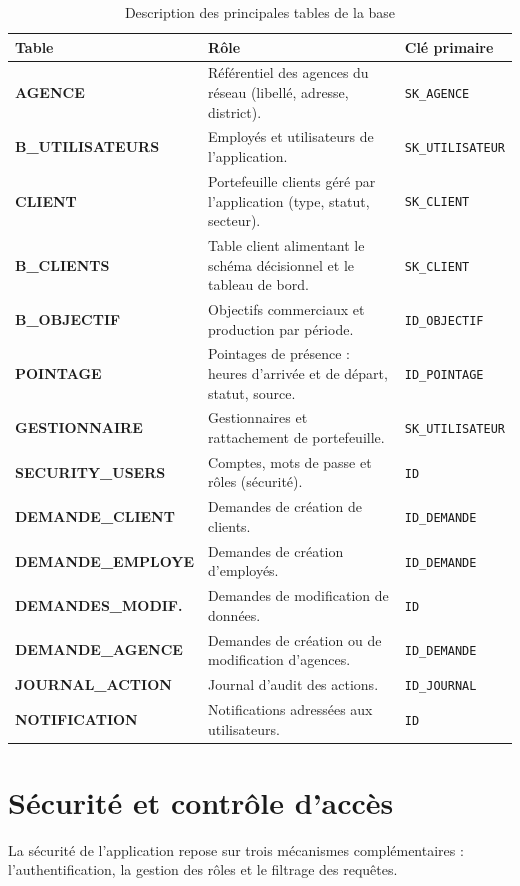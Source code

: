 \begin{table}[htbp]
\centering
\caption{Description des principales tables de la base}
\label{tab:tables}
\renewcommand{\arraystretch}{1.2}
\begin{tabularx}{\textwidth}{|>{\bfseries\ttfamily}p{3.6cm}|X|p{2.8cm}|}
\hline
\textmd{\textbf{Table}} & \textbf{Rôle} & \textbf{Clé primaire}\\
\hline
AGENCE & Référentiel des agences du réseau (libellé, adresse, district). & \texttt{SK\_AGENCE}\\
\hline
B\_UTILISATEURS & Employés et utilisateurs de l'application. & \texttt{SK\_UTILISATEUR}\\
\hline
CLIENT & Portefeuille clients géré par l'application (type, statut, secteur). & \texttt{SK\_CLIENT}\\
\hline
B\_CLIENTS & Table client alimentant le schéma décisionnel et le tableau de bord. & \texttt{SK\_CLIENT}\\
\hline
B\_OBJECTIF & Objectifs commerciaux et production par période. & \texttt{ID\_OBJECTIF}\\
\hline
POINTAGE & Pointages de présence : heures d'arrivée et de départ, statut, source. & \texttt{ID\_POINTAGE}\\
\hline
GESTIONNAIRE & Gestionnaires et rattachement de portefeuille. & \texttt{SK\_UTILISATEUR}\\
\hline
SECURITY\_USERS & Comptes, mots de passe et rôles (sécurité). & \texttt{ID}\\
\hline
DEMANDE\_CLIENT & Demandes de création de clients. & \texttt{ID\_DEMANDE}\\
\hline
DEMANDE\_EMPLOYE & Demandes de création d'employés. & \texttt{ID\_DEMANDE}\\
\hline
DEMANDES\_MODIF. & Demandes de modification de données. & \texttt{ID}\\
\hline
DEMANDE\_AGENCE & Demandes de création ou de modification d'agences. & \texttt{ID\_DEMANDE}\\
\hline
JOURNAL\_ACTION & Journal d'audit des actions. & \texttt{ID\_JOURNAL}\\
\hline
NOTIFICATION & Notifications adressées aux utilisateurs. & \texttt{ID}\\
\hline
\end{tabularx}
\end{table}

\section{Sécurité et contrôle d'accès}
La sécurité de l'application repose sur trois mécanismes complémentaires :
l'authentification, la gestion des rôles et le filtrage des requêtes.

